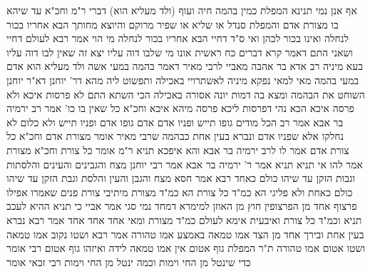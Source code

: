 \documentclass[12pt, openany]{book}
\begin{document}
{אף אנן נמי תנינא המפלת כמין בהמה חיה ועוף (ולד מעליא הוא) דברי ר"מ וחכ"א עד שיהא בו מצורת אדם 
והמפלת סנדל או שליא או שפיר מרוקם והיוצא מחותך הבא אחריו בכור לנחלה ואינו בכור לכהן ואי ס"ד דחיי הבא אחריו בכור לנחלה מי הוי 
אמר רבא לעולם דחיי ושאני התם דאמר קרא {דברים כח } ראשית אונו מי שלבו דוה עליו יצא זה שאין לבו דוה עליו 
בעא מיניה רב אדא בר אהבה מאביי לרבי מאיר דאמר בהמה במעי אשה ולד מעליא הוא אדם במעי בהמה מאי למאי נפקא מיניה לאשתרויי באכילה 
ותפשוט ליה מהא דר' יוחנן דא"ר יוחנן השוחט את הבהמה ומצא בה דמות יונה אסורה באכילה 
הכי השתא התם לא פרסות איכא ולא פרסה איכא הכא נהי דפרסות ליכא פרסה מיהא איכא
וחכ"א כל שאין בו כו' אמר רב ירמיה בר אבא אמר רב הכל מודים גופו תייש ופניו אדם אדם גופו אדם ופניו תייש ולא כלום
לא נחלקו אלא שפניו אדם ונברא בעין אחת כבהמה שרבי מאיר אומר מצורת אדם וחכ"א כל צורת אדם 
אמר לו לרב ירמיה בר אבא והא איפכא תניא ר"מ אומר כל צורת וחכ"א מצורת אמר להו אי תניא תניא 
אמר ר' ירמיה בר אבא אמר רבי יוחנן מצח והגבינים והעינים והלסתות וגבות הזקן עד שיהו כולם כאחד רבא אמר חסא מצח והגבן והעין והלסת וגבת הזקן עד שיהו כולם כאחת 
ולא פליגי הא כמ"ד כל צורת הא כמ"ד מצורת 
מיתיבי צורת פנים שאמרו אפילו פרצוף אחד מן הפרצופין חוץ מן האוזן למימרא דמחד נמי סגי 
אמר אביי כי תניא ההיא לעכב תניא וכמ"ד כל צורת ואיבעית אימא לעולם כמ"ד מצורת ומאי אחד אחד אחד 
אמר רבא נברא בעין אחת ובירך אחד מן הצד אמו טמאה באמצע אמו טהורה 
אמר רבא ושטו נקוב אמו טמאה ושטו אטום אמו טהורה 
ת"ר המפלת גוף אטום אין אמו טמאה לידה ואיזהו גוף אטום רבי אומר כדי שינטל מן החי וימות 
וכמה ינטל מן החי וימות רבי זכאי אומר}
\end{document}
